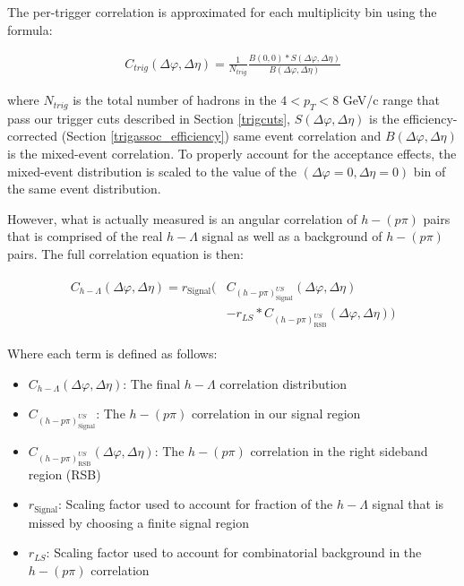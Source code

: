 \documentclass[ALICE,manyauthors]{ALICE_analysis_notes}
\begin{document}
The per-trigger correlation is approximated for each multiplicity bin using the formula:

\begin{align}
\label{corrEq}
C_{trig}(\Delta\varphi, \Delta\eta) = \frac{1}{N_{trig}}\frac{B(0,0)*S(\Delta\varphi,\Delta\eta)}{B(\Delta\varphi, \Delta\eta)}
\end{align}

where $N_{trig}$ is the total number of hadrons in the $4 < p_{T} < 8$ GeV/c range that pass our trigger cuts described in Section \ref{trigcuts}, $S(\Delta\varphi, \Delta\eta)$ is the efficiency-corrected (Section \ref{trigassoc_efficiency}) same event correlation and $B(\Delta\varphi, \Delta\eta)$ is the mixed-event correlation.  To properly account for the acceptance effects, the mixed-event distribution is scaled to the value of the $(\Delta\varphi = 0, \Delta\eta = 0)$ bin of the same event distribution.

However, what is actually measured is an angular correlation of $h-(p\pi)$ pairs that is comprised of the real $h-\Lambda$ signal as well as a background of $h-(p\pi)$ pairs. The full correlation equation is then:

\begin{align}
\label{corrEq_withBG}
\begin{split}
    C_{h-\Lambda}(\Delta\varphi, \Delta\eta) = r_{\text{Signal}}\biggl(&C_{(h-p\pi)^{US}_{\text{Signal}}}(\Delta\varphi, \Delta\eta)\\
    &- r_{LS}*C_{(h-p\pi)^{US}_{\text{RSB}}}(\Delta\varphi, \Delta\eta)\biggr)
\end{split}
\end{align}

Where each term is defined as follows:
\begin{itemize}
	\item $C_{h-\Lambda}(\Delta\varphi, \Delta\eta)$: The final $h-\Lambda$ correlation distribution
	\item $C_{(h-p\pi)^{US}_{\text{Signal}}}$: The $h-(p\pi)$ correlation in our signal region
	\item $C_{(h-p\pi)^{US}_{\text{RSB}}}(\Delta\varphi, \Delta\eta)$: The $h-(p\pi)$ correlation in the right sideband region (RSB)
	\item $r_{\text{Signal}}$: Scaling factor used to account for fraction of the $h-\Lambda$ signal that is missed by choosing a finite signal region
	\item $r_{LS}$: Scaling factor used to account for combinatorial background in the $h-(p\pi)$ correlation
\end{itemize}
\end{document}
